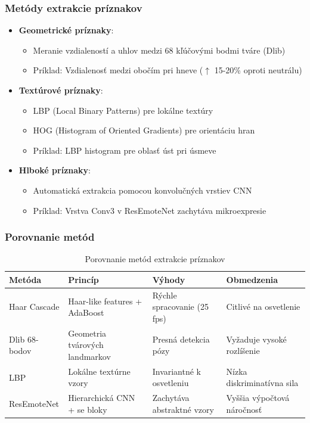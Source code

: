 \subsubsection{Metódy extrakcie príznakov}
\begin{itemize}
    \item \textbf{Geometrické príznaky}: 
    \begin{itemize}
        \item Meranie vzdialeností a uhlov medzi 68 kľúčovými bodmi tváre (Dlib)
        \item Príklad: Vzdialenosť medzi obočím pri hneve ($\uparrow$ 15-20\% oproti neutrálu)
    \end{itemize}
    
    \item \textbf{Textúrové príznaky}:
    \begin{itemize}
        \item LBP (Local Binary Patterns) pre lokálne textúry
        \item HOG (Histogram of Oriented Gradients) pre orientáciu hran
        \item Príklad: LBP histogram pre oblasť úst pri úsmeve
    \end{itemize}
    
    \item \textbf{Hlboké príznaky}:
    \begin{itemize}
        \item Automatická extrakcia pomocou konvolučných vrstiev CNN
        \item Príklad: Vrstva Conv3 v ResEmoteNet zachytáva mikroexpresie
    \end{itemize}
\end{itemize}

\subsubsection{Porovnanie metód}
\begin{table}[H]
\centering
\begin{tabularx}{\textwidth}{|l|X|X|X|}
    \hline
    \textbf{Metóda} & \textbf{Princíp} & \textbf{Výhody} & \textbf{Obmedzenia} \\ \hline
    Haar Cascade & Haar-like features + AdaBoost & Rýchle spracovanie (25 fps) & Citlivé na osvetlenie \\ \hline
    Dlib 68-bodov & Geometria tvárových landmarkov & Presná detekcia pózy & Vyžaduje vysoké rozlíšenie \\ \hline
    LBP & Lokálne textúrne vzory & Invariantné k osvetleniu & Nízka diskriminatívna sila \\ \hline
    ResEmoteNet & Hierarchická CNN + \gls{se} bloky & Zachytáva abstraktné vzory & Vyššia výpočtová náročnosť \\ \hline
\end{tabularx}
\caption{Porovnanie metód extrakcie príznakov}
\end{table}

